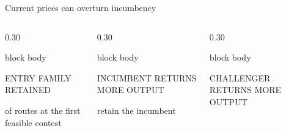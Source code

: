 \begin{frame}[label=contest]{Current prices can overturn incumbency}
\vspace{0.10cm}
\begin{columns}[T,totalwidth=0.95\textwidth]
\begin{column}{0.30\textwidth}
\begin{beamercolorbox}[rounded=true,sep=0.24cm,wd=\textwidth]{block body}
{\small\color{muted} ENTRY FAMILY RETAINED\par}\vspace{0.08cm}
{\fontsize{27}{29}\selectfont\bfseries\color{stable}\FirstContestRouteRetention\par}
{\small of routes at the first feasible contest\par}
\end{beamercolorbox}
\end{column}
\hfill
\begin{column}{0.30\textwidth}
\begin{beamercolorbox}[rounded=true,sep=0.24cm,wd=\textwidth]{block body}
{\small\color{muted} INCUMBENT RETURNS MORE OUTPUT\par}\vspace{0.08cm}
{\fontsize{27}{29}\selectfont\bfseries\color{ucldark}\ContestIncumbentLeaderRetention\par}
{\small retain the incumbent\par}
\end{beamercolorbox}
\end{column}
\hfill
\begin{column}{0.30\textwidth}
\begin{beamercolorbox}[rounded=true,sep=0.24cm,wd=\textwidth]{block body}
{\small\color{muted} CHALLENGER RETURNS MORE OUTPUT\par}\vspace{0.08cm}
{\fontsize{27}{29}\selectfont\bfseries\color{accent}\ContestChallengerLeaderRetention\par}

\end{beamercolorbox}
\end{column}
\end{columns}
\end{frame}
